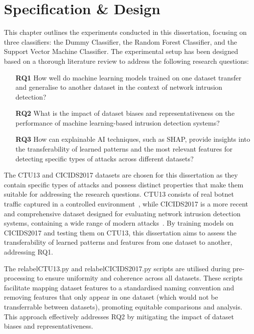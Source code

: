 \chapter{Specification \& Design}

This chapter outlines the experiments conducted in this dissertation, focusing on three classifiers: the Dummy Classifier, the Random Forest Classifier, and the Support Vector Machine Classifier. The experimental setup has been designed based on a thorough literature review to address the following research questions:

\begin{enumerate}
\item[\textbf{RQ1}] How well do machine learning models trained on one dataset transfer and generalise to another dataset in the context of network intrusion detection?
\item[\textbf{RQ2}] What is the impact of dataset biases and representativeness on the performance of machine learning-based intrusion detection systems?
\item[\textbf{RQ3}] How can explainable AI techniques, such as SHAP, provide insights into the transferability of learned patterns and the most relevant features for detecting specific types of attacks across different datasets?
\end{enumerate}

The CTU13 and CICIDS2017 datasets are chosen for this dissertation as they contain specific types of attacks and possess distinct properties that make them suitable for addressing the research questions. CTU13 consists of real botnet traffic captured in a controlled environment~\cite{garcia2014empirical}, while CICIDS2017 is a more recent and comprehensive dataset designed for evaluating network intrusion detection systems, containing a wide range of modern attacks~\cite{sharafaldin2018toward}. By training models on CICIDS2017 and testing them on CTU13, this dissertation aims to assess the transferability of learned patterns and features from one dataset to another, addressing RQ1.

The relabelCTU13.py and relabelCICIDS2017.py scripts are utilised during pre-processing to ensure uniformity and coherence across all datasets. These scripts facilitate mapping dataset features to a standardised naming convention and removing features that only appear in one dataset (which would not be transferrable between datasets), promoting equitable comparisons and analysis. This approach effectively addresses RQ2 by mitigating the impact of dataset biases and representativeness.

